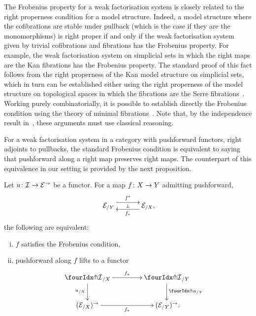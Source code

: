 \documentclass[reqno,10pt,a4paper,oneside,draft]{amsart}
\begin{document}
\begin{remark}
The Frobenius property for a weak factorisation system is closely related to the right properness condition for a model structure.
Indeed, a model structure where the cofibrations are stable under pullback (which is the case if they are the monomorphisms) is right proper if and only if the weak factorisation system given by trivial cofibrations and fibrations has the Frobenius property.
For example, the weak factorisation system on simplicial sets in which the right maps are the Kan fibrations has the Frobenius property.
The standard proof of this fact follows from the right properness of the Kan model structure on simplicial sets, which in turn can be established either using the right properness of the model structure on topological spaces in which the fibrations are the Serre fibrations~\cite[Theorem~13.1.13]{hirschhorn-model-localizations}.
Working purely combinatorially, it is possible to establish directly the Frobenius condition using the theory of minimal fibrations~\cite[Theorem~1.7.1]{joyal-tierney-notes}.
Note that, by the independence result in~\cite{coquand-non-constructivity-kan}, these arguments must use classical reasoning.
\end{remark}

\medskip

For a weak factorisation system in a category with pushforward functors, \ie right adjoints to pullbacks, the standard Frobenius condition is equivalent to saying that pushforward along a right map preserves right maps.
The counterpart of this equivalence in our setting is provided by the next proposition.

\begin{proposition} \label{lift-dependent-product}
Let $u \colon \mathcal{I} \to \mathcal{E}^\to$ be a functor.
For a map $f \colon X \to Y$ admitting pushforward,
\[
\xymatrix@C+1em{
  \catE_{/Y}
  \ar@<5pt>[r]^{f^*}
  \ar@{}[r]|{\bot}
&
  \catE_{/X}
  \ar@<5pt>[l]^{f_*} \rlap{,}
}
\]
the following are equivalent:
\begin{enumerate}[(i)]
\item $f$ satisfies the Frobenius condition,
\item pushforward along $f$ lifts to a functor
\[
\xymatrix@C=1.5cm{
  {\liftr{\cal{I}}}_{/X}
  \ar[r]^{f_*}
  \ar[d]_{u_{/X}}
&
  {\liftr{\cal{I}}}_{/Y}
  \ar[d]^{{\liftr{u}}_{/Y}}
\\
  (\catE_{/X})^\to
  \ar[r]_{f_*}
&
  (\catE_{/Y})^\to \rlap{.}
}
\]

\end{enumerate}
\end{proposition}
\end{document}
